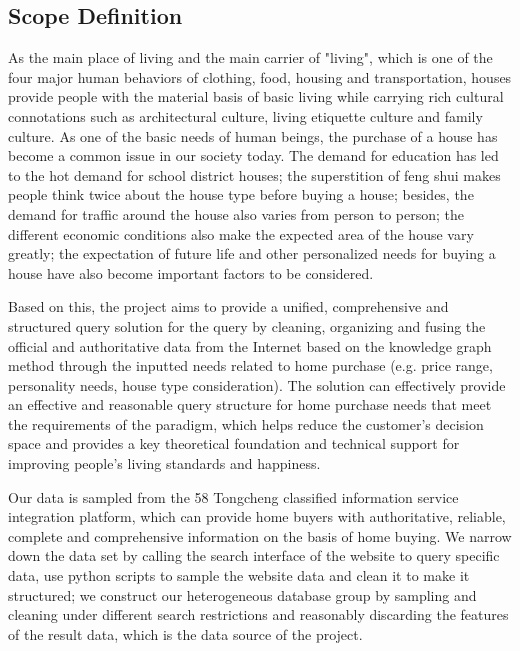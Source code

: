 \subsection{Scope Definition}

As the main place of living and the main carrier of "living", which is one of the four major human behaviors of clothing, food, housing and transportation, houses provide people with the material basis of basic living while carrying rich cultural connotations such as architectural culture, living etiquette culture and family culture. As one of the basic needs of human beings, the purchase of a house has become a common issue in our society today. The demand for education has led to the hot demand for school district houses; the superstition of feng shui makes people think twice about the house type before buying a house; besides, the demand for traffic around the house also varies from person to person; the different economic conditions also make the expected area of the house vary greatly; the expectation of future life and other personalized needs for buying a house have also become important factors to be considered.


Based on this, the project aims to provide a unified, comprehensive and structured query solution for the query by cleaning, organizing and fusing the official and authoritative data from the Internet based on the knowledge graph method through the inputted needs related to home purchase (e.g. price range, personality needs, house type consideration). The solution can effectively provide an effective and reasonable query structure for home purchase needs that meet the requirements of the paradigm, which helps reduce the customer's decision space and provides a key theoretical foundation and technical support for improving people's living standards and happiness.


Our data is sampled from the 58 Tongcheng classified information service integration platform, which can provide home buyers with authoritative, reliable, complete and comprehensive information on the basis of home buying. We narrow down the data set by calling the search interface of the website to query specific data, use python scripts to sample the website data and clean it to make it structured; we construct our heterogeneous database group by sampling and cleaning under different search restrictions and reasonably discarding the features of the result data, which is the data source of the project.




